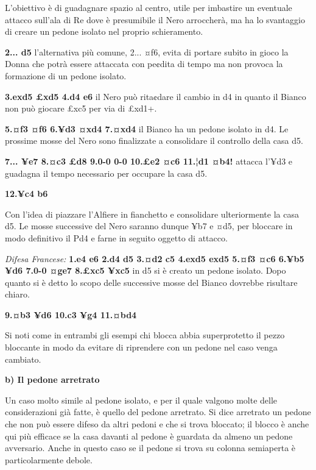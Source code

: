 L'obiettivo è di guadagnare spazio al centro, utile per imbastire un
eventuale attacco sull'ala di Re dove è presumibile il Nero arroccherà,
ma ha lo svantaggio di creare un pedone isolato nel proprio
schieramento.

\textbf{2... d5} l'alternativa più comune, 2... ¤f6, evita di portare
subito in gioco la Donna che potrà essere attaccata con pe¢dita di tempo
ma non provoca la formazione di un pedone isolato.

\textbf{3.exd5 £xd5 4.d4 e6} il Nero può rita¢dare il cambio in d4 in
quanto il Bianco non può giocare £xc5 per via di £xd1+.

\textbf{5.¤f3 ¤f6 6.¥d3 ¤xd4 7.¤xd4} il Bianco ha un pedone isolato in
d4. Le prossime mosse del Nero sono finalizzate a consolidare il
controllo della casa d5.

\textbf{7... ¥e7 8.¤c3 £d8 9.0-0 0-0 10.£e2 ¤c6 11.¦d1 ¤b4!} attacca
l'¥d3 e guadagna il tempo necessario per occupare la casa d5.

\textbf{12.¥c4 b6}


Con l'idea di piazzare l'Alfiere in fianchetto e consolidare
ulteriormente la casa d5. Le mosse successive del Nero saranno dunque
¥b7 e ¤d5, per bloccare in modo definitivo il Pd4 e farne in seguito
oggetto di attacco.

\emph{Difesa Francese:} \textbf{1.e4 e6 2.d4 d5 3.¤d2 c5 4.exd5 exd5
5.¤f3 ¤c6 6.¥b5 ¥d6 7.0-0 ¤ge7 8.£xc5 ¥xc5} in d5 si è creato un pedone
isolato. Dopo quanto si è detto lo scopo delle successive mosse del
Bianco dovrebbe risultare chiaro.

\textbf{9.¤b3 ¥d6 10.c3 ¥g4 11.¤bd4}


Si noti come in entrambi gli esempi chi blocca abbia superprotetto il
pezzo bloccante in modo da evitare di riprendere con un pedone nel caso
venga cambiato.

\textbf{b) Il pedone arretrato}

Un caso molto simile al pedone isolato, e per il quale valgono molte
delle considerazioni già fatte, è quello del pedone arretrato. Si dice
arretrato un pedone che non può essere difeso da altri pedoni e che si
trova bloccato; il blocco è anche qui più efficace se la casa davanti al
pedone è guardata da almeno un pedone avversario. Anche in questo caso
se il pedone si trova su colonna semiaperta è particolarmente debole.


